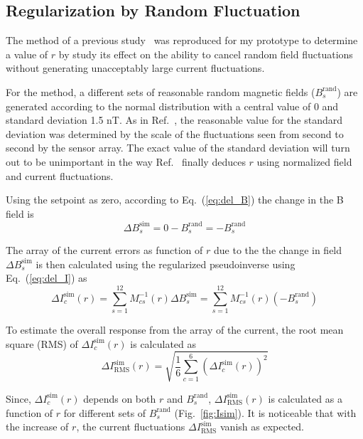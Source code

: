 \subsection{Regularization by Random Fluctuation}\label{sec:mont}

The method of a previous study~\cite{bea} was reproduced for my prototype to determine a value of $r$ by study its effect on the ability to cancel random field fluctuations without generating unacceptably large current fluctuations.

For the method, a different sets of reasonable random magnetic fields ($B_s^{\text{rand}}$) are generated according to the normal distribution with a central value of 0 and standard deviation 1.5 nT. As in Ref.~\cite{bea}, the reasonable value for the standard deviation was determined by the scale of the fluctuations seen from second to second by the sensor array. The exact value of the standard deviation will turn out to be unimportant in the way Ref.~\cite{bea} finally deduces $r$ using normalized field and current fluctuations.

Using the setpoint as zero, according to Eq.~(\ref{eq:del_B}) the change in the B field is  
\begin{equation}\label{eq:del_Bs}
    \Delta B_s^{\text{sim}} = 0 - B_s^{\text{rand}}=-B_s^{\text{rand}}
\end{equation}

The array of the current errors  as function of $r$ due to the the change in field $\Delta B_s^{\text{sim}}$ is then calculated using the regularized pseudoinverse using Eq.~(\ref{eq:del_I}) as
\begin{equation}\label{eq:del_Is}
    \Delta I_c^{\text{sim}}(r) =\sum_{s=1}^{12} M^{-1}_{cs}(r) \Delta B_s^{\text{sim}}=\sum_{s=1}^{12} M^{-1}_{cs}(r) (-B_s^{\text{rand}})
\end{equation}

To estimate the overall response from the array of the current, the root mean square (RMS) of $\Delta I_c^{\text{sim}}(r)$ is calculated as
\begin{equation}\label{eq:delta_Isim_rms}
     \Delta I_{\text{RMS}}^{\text{sim}}(r)= \sqrt{\frac{1}{6}\sum_{c=1}^6 (\Delta I_c^{\text{sim}}(r))^2}
\end{equation}

Since, $\Delta I_c^{\text{sim}}(r)$ depends on both $r$ and $B_s^{\text{rand}}$, $ \Delta I_{\text{RMS}}^{\text{sim}}(r)$  is calculated as a function of $r$ for different sets of $B_s^{\text{rand}}$ (Fig.~\ref{fig:Isim}). It is noticeable that with the increase of $r$, the current fluctuations $\Delta I_{\text{RMS}}^{\text{sim}}$ vanish as expected.


